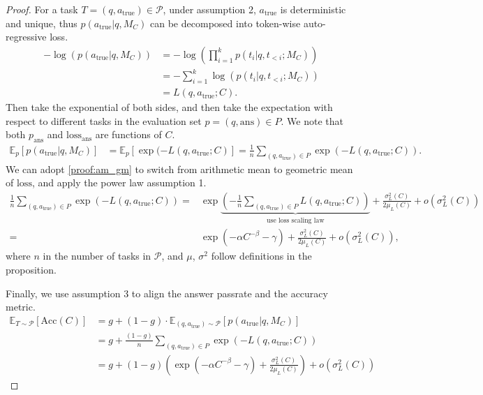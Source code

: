 \begin{proof}
For a task $T=(q,a_{\text{true}}) \in \mathcal{P}$, under assumption 2, $a_{\text{true}}$ is deterministic and unique, thus $p(a_{\text{true}}|q, M_C)$ can be decomposed into token-wise auto-regressive loss.
\begin{align}
\label{eq:loss_passrate}
    -\log (p(a_{\text{true}}|q, M_C))&= -\log\left(\prod_{i=1}^k p(t_i|q,t_{<i};M_C)\right) \\ 
    &=-\sum_{i=1}^k\log\left(p(t_i|q,t_{<i};M_C)\right)\\ 
    &=L(q,a_{\text{true}};C).
\end{align}
Then take the exponential of both sides, and then take the expectation with respect to different tasks in the evaluation set $p=(q,\mathrm{ans})\in P$. We note that both $p_{\mathrm{ans}}$ and $\mathrm{loss}_{\mathrm{ans}}$ are functions of $C$.
\begin{align}
\mathbb{E}_p[p(a_{\text{true}}|q, M_C)]&=\mathbb{E}_p[\exp(-L(q,a_{\text{true}};C)] =\frac{1}{n}\sum_{(q, a_{\text{true}})\in P} \exp(-L(q,a_{\text{true}};C)).
\end{align}
We can adopt \cref{proof:am_gm} to switch from arithmetic mean to geometric mean of $\mathrm{loss}$, and apply the power law assumption 1. 
\begin{align}
\label{eq:loss_function}
    \frac{1}{n}\sum_{(q, a_{\text{true}})\in P} \exp(-L(q,a_{\text{true}};C)) =& \exp{\underbrace{\left(-\frac{1}{n}\sum_{(q, a_{\text{true}})\in P}L(q,a_{\text{true}};C)\right)}_{\text{use loss scaling law}}} + \frac{\sigma_L^2(C)}{2\mu_L(C)} + o\left(\sigma_L^2(C)\right) \\
    =& \exp{(-\alpha C^{-\beta}-\gamma)} + \frac{\sigma_L^2(C)}{2\mu_L(C)} + o\left(\sigma_L^2(C)\right),
\end{align}
where $n$ in the number of tasks in $\mathcal{P}$, and $\mu$, $\sigma^2$ follow definitions in the proposition.

Finally, we use assumption 3 to align the answer passrate and the accuracy metric. 
\begin{align}
\mathbb{E}_{T \sim \mathcal{P}}[\mathrm{Acc}(C)] &= g + (1-g) \cdot \mathbb{E}_{(q,a_{\text{true}}) \sim \mathcal{P}}[p(a_{\text{true}}|q, M_C)] \\
&=g+\frac{(1-g)}{n}\sum_{(q, a_{\text{true}})\in P} \exp(-L(q,a_{\text{true}};C)) \\
&=g+(1-g)\left(\exp{(-\alpha C^{-\beta}-\gamma)} + \frac{\sigma_L^2(C)}{2\mu_L(C)} \right)+ o\left(\sigma_L^2(C)\right) 
\end{align}


\end{proof}

